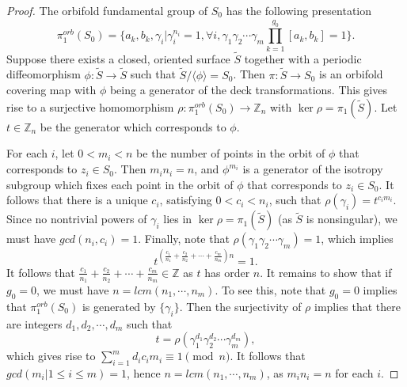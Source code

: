 \documentclass[11pt]{amsart}
\theoremstyle{plain}
\numberwithin{theorem}{section}
\theoremstyle{definition}
\newcommand{\Z}{{\mathbb Z}}
\begin{document}
\begin{proof}
The orbifold fundamental group of $S_0$ has the following presentation
$$
\pi_1^{orb}(S_0)=\{a_k,b_k,\gamma_i |\gamma_i^{n_i}=1, \forall i, \gamma_1\gamma_2\cdots
\gamma_m \prod_{k=1}^{g_0} [a_k,b_k]=1\}.
$$
Suppose there exists a closed, oriented surface $\tilde{S}$ together 
with a periodic diffeomorphism $\phi: \tilde{S}\rightarrow \tilde{S}$ such that $\tilde{S}/\langle \phi\rangle=S_0$.
Then $\pi: \tilde{S}\rightarrow S_0$ is an orbifold covering map with $\phi$ being a generator of the deck
transformations. This gives rise to a surjective homomorphism $\rho: \pi_1^{orb}(S_0)\rightarrow \Z_n$
with $\ker\rho=\pi_1(\tilde{S})$. Let $t\in\Z_n$ be the generator which corresponds to $\phi$. 

For each $i$, let $0<m_i<n$ be the number of points in the orbit of $\phi$ that corresponds to 
$z_i\in S_0$. Then $m_in_i=n$, and $\phi^{m_i}$ is a generator of the isotropy subgroup which fixes
each point in the orbit of $\phi$ that corresponds to $z_i\in S_0$. It follows that there is a unique
$c_i$, satisfying $0<c_i<n_i$, such that $\rho(\gamma_i)=t^{c_im_i}$. Since no nontrivial powers of
$\gamma_i$ lies in $\ker\rho=\pi_1(\tilde{S})$ (as $\tilde{S}$ is nonsingular), we must have $gcd(n_i,c_i)=1$.
Finally, note that $\rho(\gamma_1\gamma_2\cdots\gamma_m)=1$, which implies 
$$
t^{(\frac{c_1}{n_1}+\frac{c_2}{n_2}+\cdots+\frac{c_m}{n_m})n}=1.
$$
It follows that $\frac{c_1}{n_1}+\frac{c_2}{n_2}+\cdots+\frac{c_m}{n_m}\in\Z$ as $t$ has order $n$.
It remains to show that if $g_0=0$, we must have $n=lcm(n_1,\cdots,n_m)$. To see this, note that
$g_0=0$ implies that $\pi_1^{orb}(S_0)$ is generated by $\{\gamma_i\}$. Then the surjectivity of
$\rho$ implies that there are integers $d_1,d_2,\cdots,d_m$ such that
$$
t=\rho(\gamma_1^{d_1}\gamma_2^{d_2}\cdots\gamma_m^{d_m}),
$$
which gives rise to $\sum_{i=1}^m d_ic_im_i\equiv 1 \pmod{n}$. It follows that
$gcd(m_i|1\leq i\leq m)=1$, hence $n=lcm(n_1,\cdots,n_m)$, as $m_in_i=n$ for each $i$. 


\end{proof}
\end{document}
